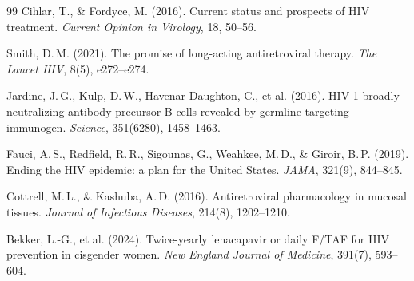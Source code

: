 ﻿\documentclass[a4paper,12pt]{article}
\theoremstyle{definition}
\begin{document}
\begin{thebibliography}{99}
Cihlar, T., \& Fordyce, M. (2016).
Current status and prospects of HIV treatment.
\textit{Current Opinion in Virology}, 18, 50--56.

Smith, D.\,M. (2021).
The promise of long-acting antiretroviral therapy.
\textit{The Lancet HIV}, 8(5), e272--e274.

Jardine, J.\,G., Kulp, D.\,W., Havenar-Daughton, C., et al. (2016).
HIV-1 broadly neutralizing antibody precursor B cells revealed by germline-targeting
immunogen.
\textit{Science}, 351(6280), 1458--1463.

Fauci, A.\,S., Redfield, R.\,R., Sigounas, G., Weahkee, M.\,D., \& Giroir, B.\,P. (2019).
Ending the HIV epidemic: a plan for the United States.
\textit{JAMA}, 321(9), 844--845.

Cottrell, M.\,L., \& Kashuba, A.\,D. (2016).
Antiretroviral pharmacology in mucosal tissues.
\textit{Journal of Infectious Diseases}, 214(8), 1202--1210.

Bekker, L.-G., et al. (2024).
Twice-yearly lenacapavir or daily F/TAF for HIV prevention in cisgender women.
\textit{New England Journal of Medicine}, 391(7), 593--604.

\end{thebibliography}
\end{document}
